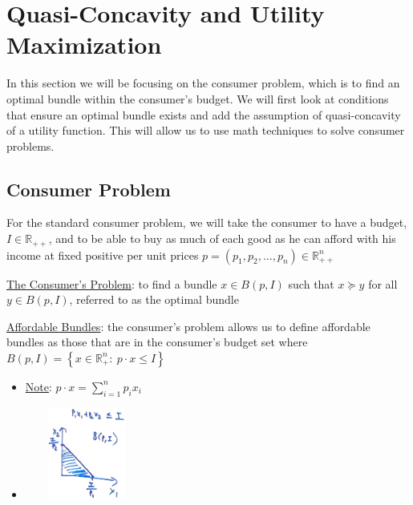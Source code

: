 \documentclass{article}
\begin{document}
\newpage

\vspace{2.5mm}
\section{Quasi-Concavity and Utility Maximization}
In this section we will be focusing on the consumer problem, which is to find an optimal bundle within the consumer's budget. We will first look at conditions that ensure an optimal bundle exists and add the assumption of quasi-concavity of a utility function. This will allow us to use math techniques to solve consumer problems. \par
\vspace{6mm}
\subsection{Consumer Problem}
For the standard consumer problem, we will take the consumer to have a budget, $I \in \mathbb{R}_{++}$, and to be able to buy as much of each good as he can afford with his income at fixed positive per unit prices $p = (p_{1}, p_{2}, \dots, p_{n}) \in \mathbb{R}_{++}^{n}$ \par \vspace{0.3em}
\underline{The Consumer's Problem}: to find a bundle $x \in B(p, I)$ such that $x \succeq y$ for all $y \in B(p, I)$, referred to as the optimal bundle \par
\underline{Affordable Bundles}: the consumer's problem allows us to define affordable bundles as those that are in the consumer's budget set where $B(p, I) = \left\{ x \in \mathbb{R}_{+}^{n}: \ p \cdot x \leq I \right\}$
\begin{itemize}
  \item  \underline{Note}: $p \cdot x = \sum_{i=1}^{n}p_{i}x_{i}$
  \item  \includegraphics[width=4cm, height=3cm]{pic13}
\end{itemize}
\par
\vspace{6mm}
\end{document}

